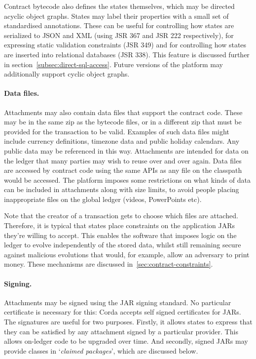 \documentclass{article}
\begin{document}
Contract bytecode also defines the states themselves, which may be directed acyclic object graphs. States may label
their properties with a small set of standardised annotations. These can be useful for controlling how states are
serialized to JSON and XML (using JSR 367 and JSR 222 respectively), for expressing static validation constraints
(JSR 349) and for controlling how states are inserted into relational databases (JSR 338). This feature is
discussed further in section~\cref{subsec:direct-sql-access}. Future versions of the platform may additionally support cyclic object graphs.

\paragraph{Data files.}Attachments may also contain data files that support the contract code. These may be in the
same zip as the bytecode files, or in a different zip that must be provided for the transaction to be valid.
Examples of such data files might include currency definitions, timezone data and public holiday calendars. Any
public data may be referenced in this way. Attachments are intended for data on the ledger that many parties may
wish to reuse over and over again. Data files are accessed by contract code using the same APIs as any file on the
classpath would be accessed. The platform imposes some restrictions on what kinds of data can be included in
attachments along with size limits, to avoid people placing inappropriate files on the global ledger (videos,
PowerPoints etc).

Note that the creator of a transaction gets to choose which files are attached. Therefore, it is typical that
states place constraints on the application JARs they're willing to accept. This enables the software that imposes
logic on the ledger to evolve independently of the stored data, whilst still remaining secure against malicious
evolutions that would, for example, allow an adversary to print money. These mechanisms are discussed
in~\cref{sec:contract-constraints}.

\paragraph{Signing.}Attachments may be signed using the JAR signing standard. No particular certificate is
necessary for this: Corda accepts self signed certificates for JARs. The signatures are useful for two purposes.
Firstly, it allows states to express that they can be satisfied by any attachment signed by a particular provider.
This allows on-ledger code to be upgraded over time. And secondly, signed JARs may provide classes in
`\emph{claimed packages}', which are discussed below.
\end{document}
